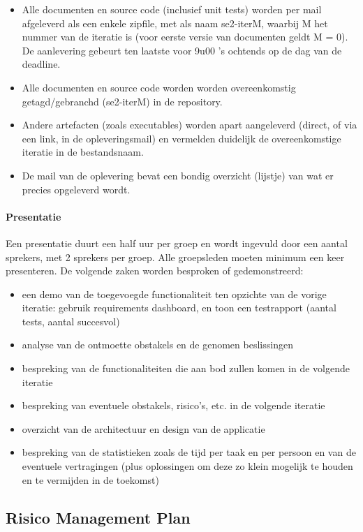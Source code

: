 \begin{itemize}
\item Alle documenten en source code (inclusief unit tests) worden per mail afgeleverd als een
enkele zipfile, met als naam se2-iterM, waarbij M het nummer van de iteratie is (voor
eerste versie van documenten geldt M = 0). De aanlevering gebeurt ten laatste voor 9u00 ’s
ochtends op de dag van de deadline.
\item Alle documenten en source code worden worden overeenkomstig getagd/gebranchd (se2-iterM)
in de repository.
\item Andere artefacten (zoals executables) worden apart aangeleverd (direct, of via een link, in de
opleveringsmail) en vermelden duidelijk de overeenkomstige iteratie in de bestandsnaam.
\item De mail van de oplevering bevat een bondig overzicht (lijstje) van wat er precies opgeleverd
wordt.
\end{itemize}

\paragraph{Presentatie}
Een presentatie duurt een half uur per groep en wordt ingevuld door een aantal sprekers, met 2 sprekers
per groep. Alle groepsleden moeten minimum een keer presenteren. De volgende zaken worden
besproken of gedemonstreerd:

\begin{itemize}
\item een demo van de toegevoegde functionaliteit ten opzichte van de vorige iteratie: gebruik requirements
dashboard, en toon een testrapport (aantal tests, aantal succesvol)
\item analyse van de ontmoette obstakels en de genomen beslissingen
\item bespreking van de functionaliteiten die aan bod zullen komen in de volgende iteratie
\item bespreking van eventuele obstakels, risico’s, etc. in de volgende iteratie
\item overzicht van de architectuur en design van de applicatie
\item bespreking van de statistieken zoals de tijd per taak en per persoon en van de eventuele vertragingen
(plus oplossingen om deze zo klein mogelijk te houden en te vermijden in de toekomst)
\end{itemize}

\subsection{Risico Management Plan}

